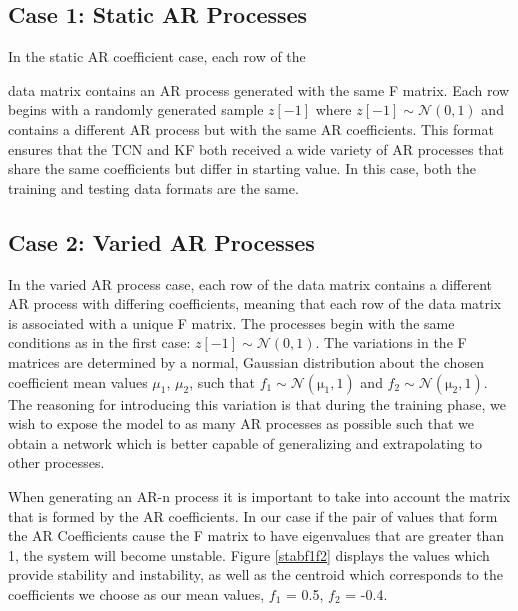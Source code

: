 \documentclass[twocolumn,letterpaper]{IEEEAerospaceCLS}  %
\begin{document}
\subsection{Case 1: Static AR Processes}

In the static AR coefficient case, each row of the 
 
data matrix contains an AR process generated with the same F matrix. Each row begins with a randomly generated sample $z[-1]$ where 
\(
z[-1] \sim \mathcal{N} \mathrm{(0,1)}
\)
and contains a different AR process but with the same AR coefficients. This format ensures that the TCN and KF both received a wide variety of AR processes that share the same coefficients but differ in starting value. In this case, both the training and testing data formats are the same. 

\subsection{Case 2: Varied AR Processes}

In the varied AR process case, each row of the data matrix contains a different AR process with differing coefficients, meaning that each row of the data matrix is associated with a unique F matrix.  The processes begin with the same conditions as in the first case: 
\(
z[-1] \sim \mathcal{N} \mathrm{(0,1)}
\). 
The variations in the F matrices are determined by a normal, Gaussian distribution about the chosen coefficient mean values $\mu_1$, $\mu_2$, such that 
\(
f_1 \sim \mathcal{N} \mathrm{(\mu_1, 1)} 
\)
and 
\(
f_2 \sim \mathcal{N} \mathrm{(\mu_2, 1)}
\). 
The reasoning for introducing this variation is that during the training phase, we wish to expose the model to as many AR processes as possible such that we obtain a network which is better capable of generalizing and extrapolating to other processes. 

When generating an AR-n process it is important to take into account the matrix that is formed by the AR coefficients. 
In our case if the pair of values that form the AR Coefficients
cause the F matrix to have eigenvalues that are greater than 1, the system will become unstable. Figure \ref{stabf1f2} displays the values which provide stability and instability, as well as the centroid which corresponds to the coefficients we choose as our mean values, 
$f_1$ = 0.5, $f_2$ = -0.4.
\end{document}
